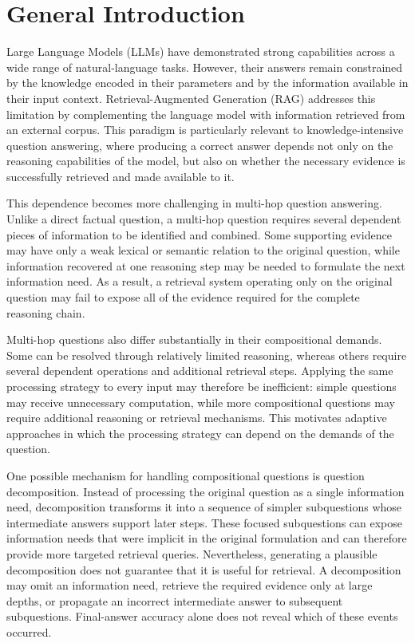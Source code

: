 \chapter*{General Introduction}
{}
\label{chap:introduction}

Large Language Models (LLMs) have demonstrated strong capabilities across a
wide range of natural-language tasks. However, their answers remain constrained
by the knowledge encoded in their parameters and by the information available
in their input context. Retrieval-Augmented Generation (RAG) addresses this
limitation by complementing the language model with information retrieved from
an external corpus. This paradigm is particularly relevant to
knowledge-intensive question answering, where producing a correct answer
depends not only on the reasoning capabilities of the model, but also on whether
the necessary evidence is successfully retrieved and made available to it.

This dependence becomes more challenging in multi-hop question answering.
Unlike a direct factual question, a multi-hop question requires several
dependent pieces of information to be identified and combined. Some supporting
evidence may have only a weak lexical or semantic relation to the original
question, while information recovered at one reasoning step may be needed to
formulate the next information need. As a result, a retrieval system operating
only on the original question may fail to expose all of the evidence required
for the complete reasoning chain.

Multi-hop questions also differ substantially in their compositional demands.
Some can be resolved through relatively limited reasoning, whereas others
require several dependent operations and additional retrieval steps. Applying
the same processing strategy to every input may therefore be inefficient:
simple questions may receive unnecessary computation, while more compositional
questions may require additional reasoning or retrieval mechanisms. This
motivates adaptive approaches in which the processing strategy can depend on
the demands of the question.

One possible mechanism for handling compositional questions is question
decomposition. Instead of processing the original question as a single
information need, decomposition transforms it into a sequence of simpler
subquestions whose intermediate answers support later steps. These focused
subquestions can expose information needs that were implicit in the original
formulation and can therefore provide more targeted retrieval queries.
Nevertheless, generating a plausible decomposition does not guarantee that it
is useful for retrieval. A decomposition may omit an information need, retrieve
the required evidence only at large depths, or propagate an incorrect
intermediate answer to subsequent subquestions. Final-answer accuracy alone
does not reveal which of these events occurred.

